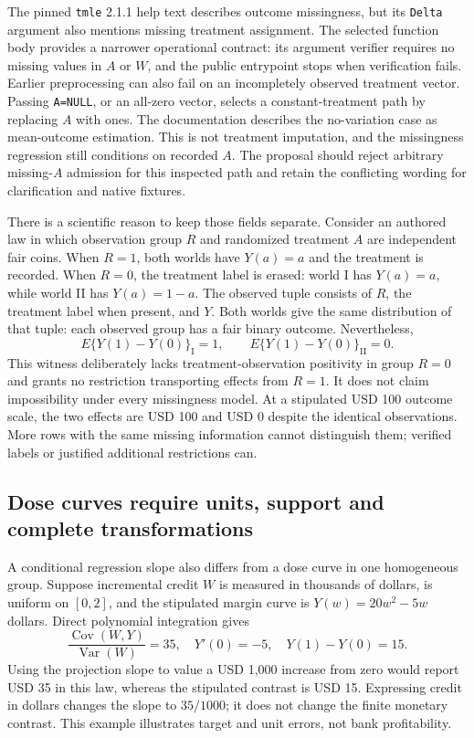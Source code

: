 The pinned \texttt{tmle} 2.1.1 help text describes outcome missingness, but its
\texttt{Delta} argument also mentions missing treatment assignment. The selected
function body provides a narrower operational contract: its argument verifier
requires no missing values in $A$ or $W$, and the public entrypoint stops when
verification fails. Earlier preprocessing can also fail on an incompletely
observed treatment vector. Passing \texttt{A=NULL}, or an all-zero vector,
selects a constant-treatment path by replacing $A$ with ones. The documentation
describes the no-variation case as mean-outcome estimation. This is not treatment
imputation, and the missingness regression still conditions on recorded $A$.
The proposal should reject arbitrary missing-$A$ admission for this inspected
path and retain the conflicting wording for clarification and native fixtures.
\citep{exec20_rfx_tmle}

There is a scientific reason to keep those fields separate. Consider an authored
law in which observation group $R$ and randomized treatment $A$ are independent
fair coins. When $R=1$, both worlds have $Y(a)=a$ and the treatment is recorded.
When $R=0$, the treatment label is erased: world I has $Y(a)=a$, while world II
has $Y(a)=1-a$. The observed tuple consists of $R$, the treatment label when
present, and $Y$. Both worlds give the same distribution of that tuple: each
observed group has a fair binary outcome. Nevertheless,
\begin{equation}
 E\{Y(1)-Y(0)\}_{\mathrm{I}}=1,
 \qquad E\{Y(1)-Y(0)\}_{\mathrm{II}}=0.
 \label{exec20:rfx-missing}
\end{equation}
This witness deliberately lacks treatment-observation positivity in group
$R=0$ and grants no restriction transporting effects from $R=1$. It does not
claim impossibility under every missingness model. At a stipulated USD 100
outcome scale, the two effects are USD 100 and USD 0 despite the identical
observations. More rows with the same missing information cannot distinguish
them; verified labels or justified additional restrictions can.
\citep{exec20_rfx_reference}

\subsection{Dose curves require units, support and complete transformations}

A conditional regression slope also differs from a dose curve in one homogeneous
group. Suppose incremental credit $W$ is measured in thousands of dollars,
is uniform on $[0,2]$, and the stipulated margin curve is
$Y(w)=20w^2-5w$ dollars. Direct polynomial integration gives
\begin{equation}
 \frac{\operatorname{Cov}(W,Y)}{\operatorname{Var}(W)}=35,
 \quad Y'(0)=-5,\quad Y(1)-Y(0)=15.
 \label{exec20:rfx-dose}
\end{equation}
Using the projection slope to value a USD 1,000 increase from zero would report
USD 35 in this law, whereas the stipulated contrast is USD 15. Expressing credit
in dollars changes the slope to $35/1000$; it does not change the finite monetary
contrast. This example illustrates target and unit errors, not bank profitability.
\citep{exec20_rfx_reference}

